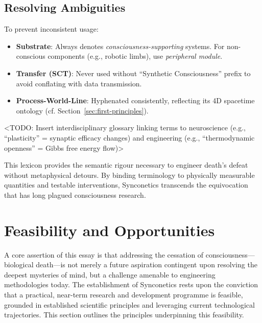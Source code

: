 \documentclass[10pt]{article}
\begin{document}
\begin{sloppypar}
  \subsection{Resolving Ambiguities}
  To prevent inconsistent usage:
  \begin{itemize}
    \item \textbf{Substrate}: Always denotes \textit{consciousness-supporting} systems. For non-conscious components (e.g., robotic limbs), use \textit{peripheral module}.
    \item \textbf{Transfer (SCT)}: Never used without “Synthetic Consciousness” prefix to avoid conflating with data transmission.
    \item \textbf{Process-World-Line}: Hyphenated consistently, reflecting its 4D spacetime ontology (cf. Section~\ref{sec:first-principles}).
  \end{itemize}

  <TODO: Insert interdisciplinary glossary linking terms to neuroscience (e.g., “plasticity” = synaptic efficacy changes) and engineering (e.g., “thermodynamic openness” = Gibbs free energy flow)>

  This lexicon provides the semantic rigour necessary to engineer death’s defeat without metaphysical detours. By binding terminology to physically measurable quantities and testable interventions, Synconetics transcends the equivocation that has long plagued consciousness research.


  \section{Feasibility and Opportunities}
  \label{sec:feasibility}

  A core assertion of this essay is that addressing the cessation of consciousness—biological death—is not merely a future aspiration contingent upon resolving the deepest mysteries of mind, but a challenge amenable to engineering methodologies today. The establishment of Synconetics rests upon the conviction that a practical, near-term research and development programme is feasible, grounded in established scientific principles and leveraging current technological trajectories. This section outlines the principles underpinning this feasibility.


\end{sloppypar}
\end{document}
